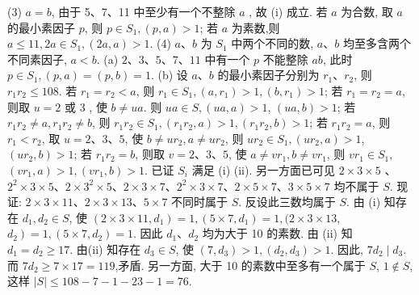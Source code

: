 (3) $a=b$, 由于 5、7、11 中至少有一个不整除 $a$ , 故 (i) 成立.
若 $a$ 为合数, 取 $a$ 的最小素因子 $p$, 则 $p \in S_1,(p, a)>1$; 若 $a$ 为素数,则 $a \leqslant 11,2 a \in S_1,(2 a, a)>1$. (4) $a 、 b$ 为 $S_1$ 中两个不同的数, $a 、 b$ 均至多含两个不同素因子, $a<b$. (a) $2 、 3 、 5 、 7 、 11$ 中有一个 $p$ 不能整除 $a b$, 此时 $p \in S_1,(p, a)=(p, b)=1$. (b) 设 $a 、 b$ 的最小素因子分别为 $r_1 、 r_2$, 则 $r_1 r_2 \leqslant 108$. 若 $r_1=r_2<a$, 则 $r_1 \in S_1,\left(a, r_1\right)>1,\left(b, r_1\right)>1$; 若 $r_1= r_2=a$, 则取 $u=2$ 或 3 , 使 $b \neq u a$. 则 $u a \in S,(u a, a)>1$, $(u a, b)>1$; 若
$r_1 r_2 \neq a, r_1 r_2 \neq b$, 则 $r_1 r_2 \in S_1,\left(r_1 r_2, a\right)>1,\left(r_1 r_2, b\right)>1$; 若 $r_1 r_2=a$, 则 $r_1<r_2$, 取 $u=2 、 3 、 5$, 使 $b \neq u r_2, a \neq u r_2$, 则 $u r_2 \in S_1,\left(u r_2, a\right)>1$, $\left(u r_2, b\right)>1$; 若 $r_1 r_2=b$, 则取 $v=2 、 3 、 5$, 使 $a \neq v r_1, b \neq v r_1$, 则 $v r_1 \in S_1$, $\left(v r_1, a\right)>1,\left(v r_1, b\right)>1$. 已证 $S_i$ 满足 (i) (ii). 另一方面已可见 $2 \times 3 \times 5$ 、 $2^2 \times 3 \times 5 、 2 \times 3^2 \times 5 、 2 \times 3 \times 7 、 2^2 \times 3 \times 7 、 2 \times 5 \times 7 、 3 \times 5 \times 7$ 均不属于 $S$. 现证: $2 \times 3 \times 11 、 2 \times 3 \times 13 、 5 \times 7$ 不同时属于 $S$. 反设此三数均属于 $S$. 由 (i) 知存在 $d_1, d_2 \in S$, 使 $\left(2 \times 3 \times 11, d_1\right)=1,\left(5 \times 7, d_1\right)=1,(2 \times 3 \times 13$, $\left.d_2\right)=1,\left(5 \times 7, d_2\right)=1$. 因此 $d_1 、 d_2$ 均为大于 10 的素数.
由 (ii) 知 $d_1= d_2 \geqslant 17$. 由(ii) 知存在 $d_3 \in S$, 使 $\left(7, d_3\right)>1,\left(d_2, d_3\right)>1$. 因此, $7 d_2 \mid d_3$. 而 $7 d_2 \geqslant 7 \times 17=119$,矛盾.
另一方面, 大于 10 的素数中至多有一个属于 $S$, $1 \notin S$, 这样 $|S| \leqslant 108-7-1-23-1=76$.



